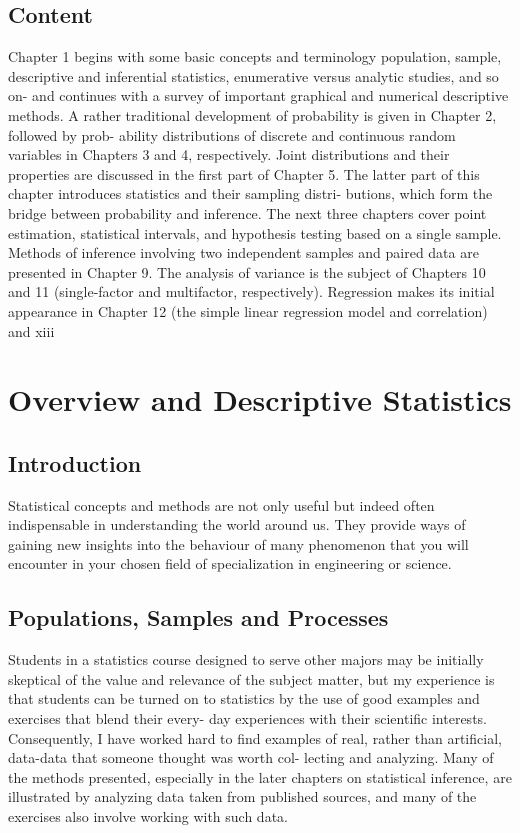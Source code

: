 \documentclass{book}
\begin{document}
\section*{Content}
Chapter 1 begins with some basic concepts and terminology population, sample, descriptive and inferential statistics, enumerative versus analytic studies, and so on- and continues with a survey of important graphical and numerical descriptive methods. A rather traditional development of probability is given in Chapter 2, followed by prob- ability distributions of discrete and continuous random variables in Chapters 3 and 4, respectively. Joint distributions and their properties are discussed in the first part of Chapter 5. The latter part of this chapter introduces statistics and their sampling distri- butions, which form the bridge between probability and inference. The next three chapters cover point estimation, statistical intervals, and hypothesis testing based on a single sample. Methods of inference involving two independent samples and paired data are presented in Chapter 9. The analysis of variance is the subject of Chapters 10 and 11 (single-factor and multifactor, respectively). Regression makes its initial appearance in Chapter 12 (the simple linear regression model and correlation) and
xiii

\chapter{Overview and Descriptive Statistics}
\section*{Introduction}
Statistical concepts and methods are not only useful but indeed often indispensable in  understanding the world around us. They provide ways of gaining new insights into the behaviour of many phenomenon that you will encounter in your chosen field of specialization in engineering or science.
\section {Populations, Samples and Processes}
Students in a statistics course designed to serve other majors may be initially skeptical of the value and relevance of the subject matter, but my experience is that students can be turned on to statistics by the use of good examples and exercises that blend their every- day experiences with their scientific interests. Consequently, I have worked hard to find examples of real, rather than artificial, data-data that someone thought was worth col- lecting and analyzing. Many of the methods presented, especially in the later chapters on statistical inference, are illustrated by analyzing data taken from published sources, and many of the exercises also involve working with such data. 
\end{document}
